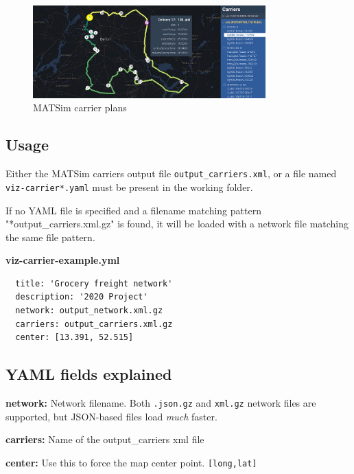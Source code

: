 \begin{figure}[H]
  \centering
  \includegraphics[width=0.8\textwidth]{assets/carriers.jpg}
  \caption{MATSim carrier plans}
\end{figure}


\hypertarget{usage}{%
\subsection{Usage}}

Either the MATSim carriers output file \texttt{output\_carriers.xml}, or a file named \texttt{viz-carrier*.yaml} must be present in the working folder.

If no YAML file is specified and a filename matching pattern "*output\_carriers.xml.gz" is found, it will be loaded with a network file matching the same file pattern.

\textbf{viz-carrier-example.yml}

\begin{lstlisting}
  title: 'Grocery freight network'
  description: '2020 Project'
  network: output_network.xml.gz
  carriers: output_carriers.xml.gz
  center: [13.391, 52.515]
\end{lstlisting}

\hypertarget{yaml-fields-explained}{%
\subsection{YAML fields explained}}

\noindent\textbf{network:} Network filename. Both \texttt{.json.gz} and \texttt{xml.gz} network
files are supported, but JSON-based files load \emph{much} faster.

\noindent\textbf{carriers:} Name of the output\_carriers xml file

\noindent\textbf{center:} Use this to force the map center point.
\texttt{{[}long,lat{]}}
